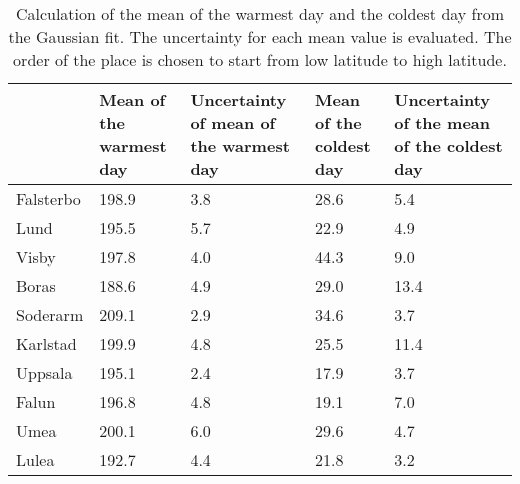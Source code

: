 \begin{table}[H]
\centering
\begin{tabular}{p{1.7cm} p{2.0cm} p{2.2cm} p{2.0cm} p{2.3cm}}
\hline
  & Mean of the warmest day & Uncertainty of mean of the warmest day & Mean of the coldest day & Uncertainty of the mean of the coldest day \\ \hline \hline
Falsterbo & 198.9                   & 3.8                                    & 28.6                    & 5.4                                        \\ \hline
Lund      & 195.5                   & 5.7                                    & 22.9                    & 4.9                                        \\ \hline
Visby     & 197.8                   & 4.0                                    & 44.3                    & 9.0                                        \\ \hline
Boras     & 188.6                   & 4.9                                    & 29.0                    & 13.4                                       \\ \hline
Soderarm  & 209.1                   & 2.9                                    & 34.6                    & 3.7                                        \\ \hline
Karlstad  & 199.9                   & 4.8                                    & 25.5                    & 11.4                                       \\ \hline
Uppsala   & 195.1                   & 2.4                                    & 17.9                    & 3.7                                        \\ \hline
Falun     & 196.8                   & 4.8                                    & 19.1                    & 7.0                                        \\ \hline
Umea      & 200.1                   & 6.0                                    & 29.6                    & 4.7                                        \\ \hline
Lulea     & 192.7                   & 4.4                                    & 21.8                    & 3.2                                        \\ \hline
\end{tabular}
\caption{Calculation of the mean of the warmest day and the coldest day from the Gaussian fit. The uncertainty for each mean value is evaluated. The order of the place is chosen to start from low latitude to high latitude. }
\label{hotColdResult}
\end{table}


